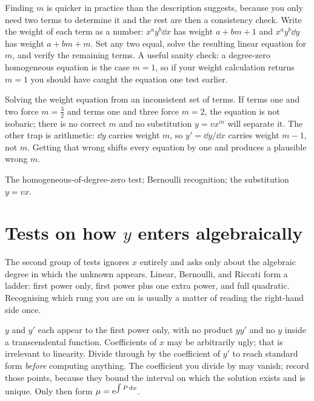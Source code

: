 Finding $m$ is quicker in practice than the description suggests, because you only need two terms to determine it and the rest are then a consistency check. Write the weight of each term as a number: $x^{a}y^{b}\dd x$ has weight $a+bm+1$ and $x^{a}y^{b}\dd y$ has weight $a+bm+m$. Set any two equal, solve the resulting linear equation for $m$, and verify the remaining terms. A useful sanity check: a degree-zero homogeneous equation is the case $m=1$, so if your weight calculation returns $m=1$ you should have caught the equation one test earlier.

\begin{trap}
Solving the weight equation from an inconsistent set of terms. If terms one and two force $m=\tfrac32$ and terms one and three force $m=2$, the equation is not isobaric; there is no correct $m$ and no substitution $y=vx^{m}$ will separate it. The other trap is arithmetic: $\dd y$ carries weight $m$, so $y'=\dd y/\dd x$ carries weight $m-1$, not $m$. Getting that wrong shifts every equation by one and produces a plausible wrong $m$.
\end{trap}

\begin{seealsob}The homogeneous-of-degree-zero test; Bernoulli recognition; the substitution $y=vx$.\end{seealsob}

\section{Tests on how $y$ enters algebraically}

The second group of tests ignores $x$ entirely and asks only about the algebraic degree in which the unknown appears. Linear, Bernoulli, and Riccati form a ladder: first power only, first power plus one extra power, and full quadratic. Recognising which rung you are on is usually a matter of reading the right-hand side once.

\cue $y$ and $y'$ each appear to the first power only, with no product $yy'$ and no $y$ inside a transcendental function. Coefficients of $x$ may be arbitrarily ugly; that is irrelevant to linearity.
\method Divide through by the coefficient of $y'$ to reach standard form \emph{before} computing anything. The coefficient you divide by may vanish; record those points, because they bound the interval on which the solution exists and is unique. Only then form $\mu=\mathrm{e}^{\int P\,\mathrm{d} x}$.

